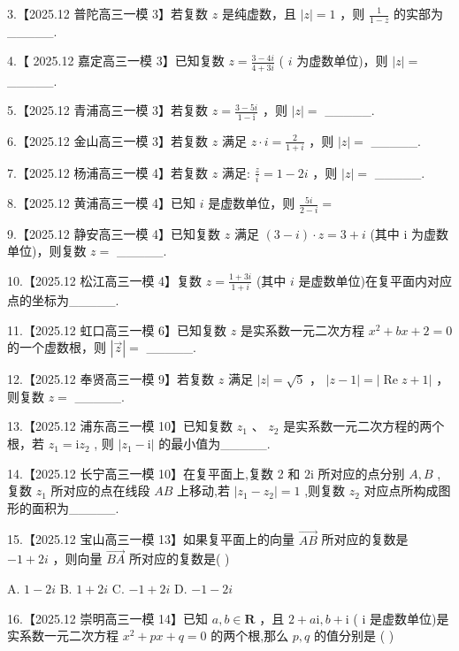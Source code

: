 \documentclass[10pt]{article}
\begin{document}
3.【2025.12 普陀高三一模 3】若复数 \(z\) 是纯虚数，且 \(\left| z\right|  = 1\) ，则 \(\frac{1}{1 - z}\) 的实部为\_\_\_\_\_.

4.【 2025.12 嘉定高三一模 3】已知复数 \(z = \frac{3 - {4i}}{4 + {3i}}\) ( \(i\) 为虚数单位)，则 \(\left| z\right|  =\) \_\_\_\_\_.

5.【2025.12 青浦高三一模 3】若复数 \(z = \frac{3 - {5i}}{1 - \mathrm{i}}\) ，则 \(\left| z\right|  =\) \_\_\_\_\_.

6.【2025.12 金山高三一模 3】若复数 \(z\) 满足 \(z \cdot  i = \frac{2}{1 + i}\) ，则 \(\left| z\right|  =\) \_\_\_\_\_.

7.【2025.12 杨浦高三一模 4】若复数 \(z\) 满足: \(\frac{z}{i} = 1 - {2i}\) ，则 \(\left| z\right|  =\) \_\_\_\_\_.

8.【2025.12 黄浦高三一模 4】已知 \(i\) 是虚数单位，则 \(\frac{5i}{2 - i} =\)

9.【2025.12 静安高三一模 4】已知复数 \(z\) 满足 \(\left( {3 - i}\right)  \cdot  z = 3 + i\) (其中 \(\mathrm{i}\) 为虚数单位)，则复数 \(z =\) \_\_\_\_\_.

10.【2025.12 松江高三一模 4】复数 \(z = \frac{1 + {3i}}{1 + i}\) (其中 \(i\) 是虚数单位)在复平面内对应点的坐标为\_\_\_\_\_.

11.【2025.12 虹口高三一模 6】已知复数 \(z\) 是实系数一元二次方程 \({x}^{2} + {bx} + 2 = 0\) 的一个虚数根，则 \(\left| \overrightarrow{z}\right|  =\) \_\_\_\_\_.

12.【2025.12 奉贤高三一模 9】若复数 \(z\) 满足 \(\left| z\right|  = \sqrt{5}\) ， \(\left| {z - 1}\right|  = \left| {\operatorname{Re}z + 1}\right|\) ，则复数 \(z =\) \_\_\_\_\_.

13.【2025.12 浦东高三一模 10】已知复数 \({z}_{1}\text{ 、 }{z}_{2}\) 是实系数一元二次方程的两个根，若 \({z}_{1} = \mathrm{i}{z}_{2}\) , 则 \(\left| {{z}_{1} - \mathrm{i}}\right|\) 的最小值为\_\_\_\_\_.

14.【2025.12 长宁高三一模 10】在复平面上,复数 2 和 \(2\mathrm{i}\) 所对应的点分别 \(A,B\) ,复数 \({z}_{1}\) 所对应的点在线段 \({AB}\) 上移动,若 \(\left| {{z}_{1} - {z}_{2}}\right|  = 1\) ,则复数 \({z}_{2}\) 对应点所构成图形的面积为\_\_\_\_\_.

15.【2025.12 宝山高三一模 13】如果复平面上的向量 \(\overrightarrow{AB}\) 所对应的复数是 \(- 1 + {2i}\) ，则向量 \(\overrightarrow{BA}\) 所对应的复数是( )

A. \(1 - {2i}\) B. \(1 + {2i}\) C. \(- 1 + {2i}\) D. \(- 1 - {2i}\)

16.【2025.12 崇明高三一模 14】已知 \(a,b \in  \mathbf{R}\) ，且 \(2 + a\mathrm{i},b + \mathrm{i}\) ( \(\mathrm{i}\) 是虚数单位)是实系数一元二次方程 \({x}^{2} + {px} + q = 0\) 的两个根,那么 \(p,q\) 的值分别是 ( )
\end{document}
